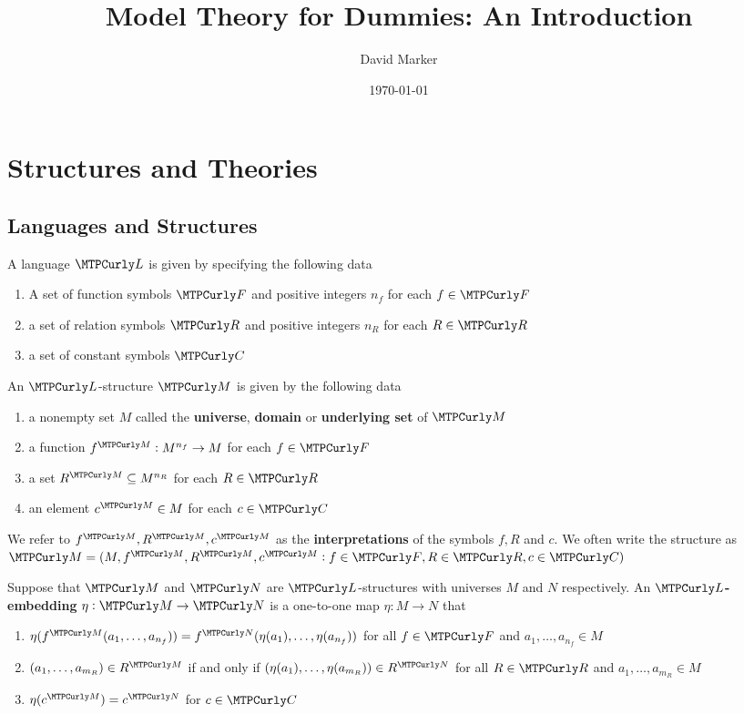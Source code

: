 \documentclass[11pt]{article}
\author{David Marker}
\date{\today}
\title{Model Theory for Dummies: An Introduction}
\begin{document}
\maketitle
\tableofcontents \clearpage\section{Structures and Theories}
\label{sec:org2e577b3}
\subsection{Languages and Structures}
\label{sec:org5cc9626}
\begin{definition}[]
A language \(\call\) is given by specifying the following data
\begin{enumerate}
\item A set of function symbols \(\calf\) and positive integers \(n_f\) for each
\(f\in\calf\)
\item a set of relation symbols \(\calr\) and positive integers \(n_R\) for each
\(R\in\calr\)
\item a set of constant symbols \(\calc\)
\end{enumerate}
\end{definition}

\begin{definition}[]
An \(\call\)-structure \(\calm\) is given by the following data
\begin{enumerate}
\item a nonempty set \(M\) called the \textbf{universe}, \textbf{domain} or \textbf{underlying set}
of \(\calm\)
\item a function \(f^\calm:M^{n_f}\to M\) for each \(f\in\calf\)
\item a set \(R^\calm\subseteq M^{n_R}\) for each \(R\in\calr\)
\item an element \(c^\calm\in M\) for each \(c\in\calc\)
\end{enumerate}
\end{definition}

We refer to \(f^\calm,R^\calm,c^\calm\) as the \textbf{interpretations} of the
symbols \(f,R\) and \(c\). We often write the structure as
\(\calm=(M,f^\calm,R^\calm,c^\calm:f\in\calf,R\in\calr,c\in\calc)\) 

\begin{definition}[]
Suppose that \(\calm\) and \(\caln\) are \(\call\)-structures with universes \(M\)
and \(N\) respectively. An \textbf{\(\call\)-embedding} \(\eta:\calm\to\caln\) is a
one-to-one map \(\eta:M\to N\) that
\begin{enumerate}
\item \(\eta(f^\calm(a_1,\dots,a_{n_f}))=f^\caln(\eta(a_1),\dots,\eta(a_{n_f}))\)
for all \(f\in\calf\) and \(a_1,\dots,a_{n_f}\in M\)
\item \((a_1,\dots,a_{m_R})\in R^\calm\) if and only if
\((\eta(a_1),\dots,\eta(a_{m_R}))\in R^\caln\) for all \(R\in\calr\) and
\(a_1,\dots,a_{m_R}\in M\)
\item \(\eta(c^\calm)=c^\caln\) for \(c\in\calc\)
\end{enumerate}
\end{definition}
\end{document}
